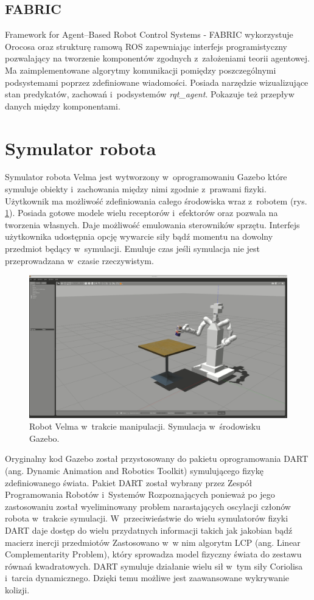 	\subsection{FABRIC}
	Framework for Agent–Based Robot Control Systems - FABRIC\cite{bib:fabric} wykorzystuje Orocosa oraz strukturę ramową ROS zapewniając interfejs programistyczny pozwalający na tworzenie komponentów zgodnych z~założeniami teorii agentowej. Ma zaimplementowane algorytmy komunikacji pomiędzy poszczególnymi podsystemami poprzez zdefiniowane wiadomości. Posiada narzędzie wizualizujące stan predykatów, zachowań i~podsystemów \textit{rqt\_agent}\cite{bib:rqtAgent}. Pokazuje też przepływ danych między komponentami.

	
	\section{Symulator robota}
	Symulator robota Velma jest wytworzony w~oprogramowaniu Gazebo \cite{bib:Gazebo} które symuluje obiekty i~zachowania między nimi zgodnie z~prawami fizyki. Użytkownik ma możliwość zdefiniowania całego środowiska wraz z~robotem (rys. \ref{fig:gazebo}). Posiada gotowe modele wielu receptorów i~efektorów oraz pozwala na tworzenia własnych. Daje możliwość emulowania sterowników sprzętu. Interfejs użytkownika udostępnia opcję wywarcie siły bądź momentu na dowolny przedmiot będący w~symulacji. Emuluje czas jeśli symulacja nie jest przeprowadzana w~czasie rzeczywistym.
	
	\begin{figure}
		\centering
		\includegraphics[width=.6\textwidth]{images/gazebo.png}
		\caption{Robot Velma w~trakcie manipulacji. Symulacja w~środowisku Gazebo.}
		\label{fig:gazebo}
	\end{figure}

	Oryginalny kod Gazebo został przystosowany do pakietu oprogramowania DART (ang. Dynamic Animation and Robotics Toolkit) \cite{bib:dart} symulującego fizykę zdefiniowanego świata. Pakiet DART został wybrany przez Zespół Programowania Robotów i~Systemów Rozpoznających ponieważ po jego zastosowaniu został wyeliminowany problem narastających oscylacji członów robota w~trakcie symulacji. W~przeciwieństwie do wielu symulatorów fizyki DART daje dostęp do wielu przydatnych informacji takich jak jakobian bądź macierz inercji przedmiotów Zastosowano w~w nim algorytm LCP (ang. Linear Complementarity Problem), \cite{bib:lpcBase} który sprowadza model fizyczny świata do zestawu równań kwadratowych. DART symuluje działanie wielu sił w~tym siły Coriolisa i~tarcia dynamicznego. Dzięki temu możliwe jest zaawansowane wykrywanie kolizji. 
	
	